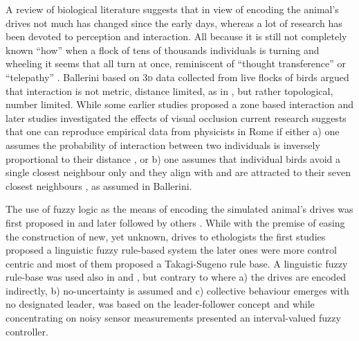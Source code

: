 A review of biological literature suggests that in view of encoding the animal's drives not much has changed since the early days, whereas a lot of research has been devoted to perception and interaction. All because it is still not completely known ``how'' when a flock of tens of thousands individuals is turning and wheeling it seems that all turn at once, reminiscent of ``thought transference'' or ``telepathy'' \cite{lebarbajec2009organized,hayes2011flights}. Ballerini\etal \cite{ballerini2008interaction} based on \textsc{3d} data collected from live flocks of birds argued that interaction is not metric, \ie distance limited, as in \cite{reynolds1987flocks}, but rather topological, \ie number limited. While some earlier studies proposed a zone based interaction \cite{couzin2002collective,couzin2005effective} and later studies investigated the effects of visual occlusion \cite{demsar2014simulated,kunz2012simulations,pearce2014role} current research suggests that one can reproduce empirical data from physicists in Rome \cite{ballerini2008interaction,cavagna2013diffusion} if either a) one assumes the probability of interaction between two individuals is inversely proportional to their distance \cite{bode2011limited}, or b) one assumes that individual birds avoid a single closest neighbour only and they align with and are attracted to their seven closest neighbours \cite{hemelrijk2015diffusion}, as assumed in Ballerini\etal \cite{ballerini2008interaction}. 

The use of fuzzy logic as the means of encoding the simulated animal's drives was first proposed in \cite{lebarbajec2003boids,lebarbajec2003fuzzifying,lebarbajec2005fuzzy,lebarbajec2005simulating} and later followed by others \cite{dong2013fuzzy,gu2008using,lee2011design,sahu2013fuzzy,tron2004mathematical,wang2007behaviour,yu2010control,yu2010obstacle}. While with the premise of easing the construction of new, yet unknown, drives to ethologists the first studies proposed a linguistic fuzzy rule-based system the later ones were more control centric and most of them proposed a Takagi-Sugeno rule base. A linguistic fuzzy rule-base was used also in \cite{sahu2013fuzzy} and \cite{lee2011design}, but contrary to \cite{lebarbajec2005simulating} where a) the drives are encoded indirectly, b) no-uncertainty is assumed and c) collective behaviour emerges with no designated leader, \cite{sahu2013fuzzy} was based on the leader-follower concept and \cite{lee2011design} while concentrating on noisy sensor measurements presented an interval-valued fuzzy controller.

